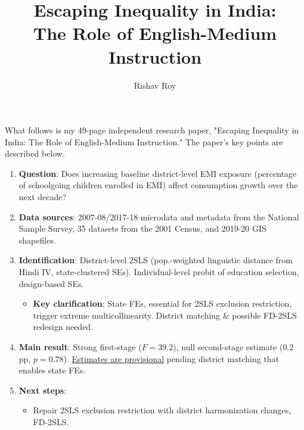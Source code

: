 \documentclass[letterpaper,12pt]{article}
\title{Escaping Inequality in India: \\ The Role of English-Medium Instruction}
\author{Rishav Roy}
\date{}
\begin{document}
\maketitle
\vspace{-6mm}
\noindent What follows is my 49-page independent research paper, "Escaping Inequality in India: The Role of English-Medium Instruction." The paper's key points are described below.

\begin{enumerate}

\item \textbf{Question}: Does increasing baseline district-level EMI exposure (percentage of schoolgoing children enrolled in EMI) affect consumption growth over the next decade? 

\item \textbf{Data sources}: 2007-08/2017-18 microdata and metadata from the National Sample Survey, 35 datasets from the 2001 Census, and 2019-20 GIS shapefiles.

\item \textbf{Identification}: District-level 2SLS (pop.-weighted linguistic distance from Hindi IV, state-clustered SEs). Individual-level probit of  education selection, design-based SEs. 
\vspace{-3mm}
\begin{itemize}
\item \textbf{Key clarification}: State FEs, essential for 2SLS exclusion restriction, trigger extreme multicollinearity. District matching \& possible FD-2SLS redesign needed.
\end{itemize}
\vspace{-2mm}

\item \textbf{Main result}: Strong first-stage ($F=39.2$), null second-stage estimate ($0.2$ pp, $p=0.78$). \underline{Estimates are provisional} pending district matching that enables state FEs.

\item \textbf{Next steps}: 
\vspace{-3mm}
\begin{itemize}
\item Repair 2SLS exclusion restriction with district harmonization changes, FD-2SLS.


\end{itemize}
\end{enumerate}
\end{document}
